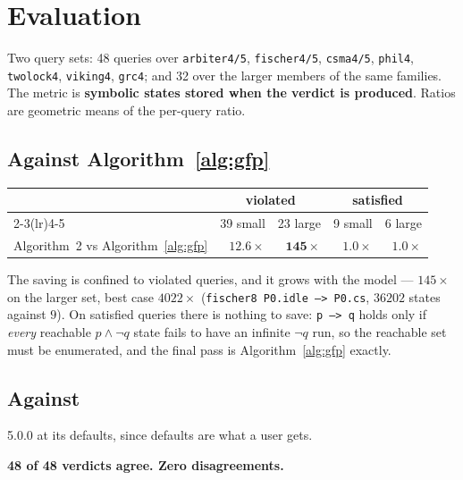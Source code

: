 \section{Evaluation}
\label{sec:otf:eval}

Two query sets: 48 queries over \texttt{arbiter4/5}, \texttt{fischer4/5}, \texttt{csma4/5},
\texttt{phil4}, \texttt{twolock4}, \texttt{viking4}, \texttt{grc4}; and 32 over the larger members
of the same families. The metric is \textbf{symbolic states stored when the verdict is produced}.
Ratios are geometric means of the per-query ratio.

\subsection{Against Algorithm~\ref{alg:gfp}}

\begin{center}
\begin{tabular}{@{}lrrrr@{}}
\toprule
 & \multicolumn{2}{c}{violated} & \multicolumn{2}{c}{satisfied} \\
\cmidrule(lr){2-3}\cmidrule(lr){4-5}
 & 39 small & 23 large & 9 small & 6 large \\
\midrule
Algorithm~2 vs Algorithm~\ref{alg:gfp} & $12.6\times$ & $\mathbf{145\times}$ & $1.0\times$ & $1.0\times$ \\
\bottomrule
\end{tabular}
\end{center}

The saving is confined to violated queries, and it grows with the model --- $145\times$ on the
larger set, best case $4022\times$ (\texttt{fischer8 P0.idle --> P0.cs}, $36202$ states against
$9$). On satisfied queries there is nothing to save: \texttt{p --> q} holds only if \emph{every}
reachable $p \wedge \lnot q$ state fails to have an infinite $\lnot q$ run, so the reachable set
must be enumerated, and the final pass is Algorithm~\ref{alg:gfp} exactly. \measured{}

\subsection{Against \uppaal{}}
\label{sec:otf:uppaal}

\verifyta{} 5.0.0 at its defaults, since defaults are what a user gets.

\begin{center}
\textbf{48 of 48 verdicts agree. Zero disagreements.} \measured{}
\end{center}

